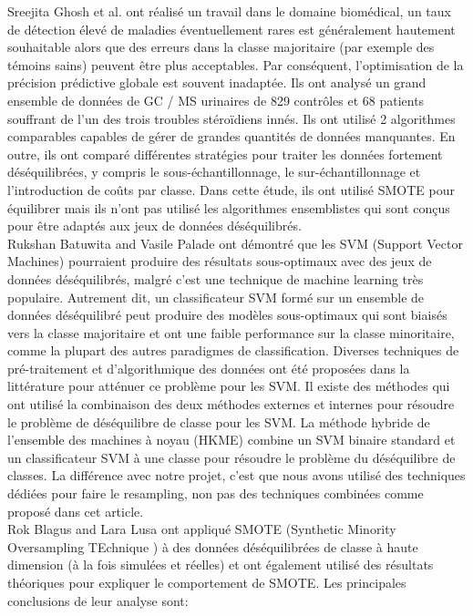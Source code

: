 \documentclass[12pt, french]{report}
\begin{document}
Sreejita Ghosh et al.  \cite{key31} ont réalisé un travail dans le domaine biomédical, un taux de détection élevé de maladies éventuellement rares est généralement hautement souhaitable alors que des erreurs dans la classe majoritaire (par exemple des témoins sains) peuvent être plus acceptables. Par conséquent, l'optimisation de la précision prédictive globale est souvent inadaptée. Ils ont analysé un grand ensemble de données de GC / MS urinaires de 829 contrôles et 68 patients souffrant de l'un des trois troubles stéroïdiens innés. Ils ont utilisé 2 algorithmes comparables capables de gérer de grandes quantités de données manquantes. En outre, ils ont comparé différentes stratégies pour traiter les données fortement déséquilibrées, y compris le sous-échantillonnage, le sur-échantillonnage et l'introduction de coûts par classe. Dans cette étude, ils ont utilisé SMOTE pour équilibrer mais ils n'ont pas utilisé les algorithmes ensemblistes qui sont conçus pour être adaptés aux jeux de données déséquilibrés. \\

Rukshan Batuwita and Vasile Palade \cite{key32} ont démontré que les SVM (Support Vector Machines) pourraient produire des résultats sous-optimaux avec des jeux de données déséquilibrés, malgré c'est une technique de machine learning très populaire. Autrement dit, un classificateur SVM formé sur un ensemble de données déséquilibré peut produire des modèles sous-optimaux qui sont biaisés vers la classe majoritaire et ont une faible performance sur la classe minoritaire, comme la plupart des autres paradigmes de classification. Diverses techniques de pré-traitement et d'algorithmique des données ont été proposées dans la littérature pour atténuer ce problème pour les SVM. Il existe des méthodes qui ont utilisé la combinaison des deux méthodes externes et internes pour résoudre le problème de déséquilibre de classe pour les SVM. La méthode hybride de l'ensemble des machines à noyau (HKME) combine un SVM binaire standard et un classificateur SVM à une classe pour résoudre le problème du déséquilibre de classes. La différence avec notre projet, c'est que nous avons utilisé des techniques dédiées pour faire le resampling, non pas des techniques combinées comme proposé dans cet article.\\

Rok Blagus and Lara Lusa \cite{key33}  ont appliqué SMOTE (Synthetic Minority Oversampling TEchnique ) à des données déséquilibrées de classe à haute dimension (à la fois simulées et réelles) et ont également utilisé des résultats théoriques pour expliquer le comportement de SMOTE. Les principales conclusions de leur analyse sont:
\end{document}
